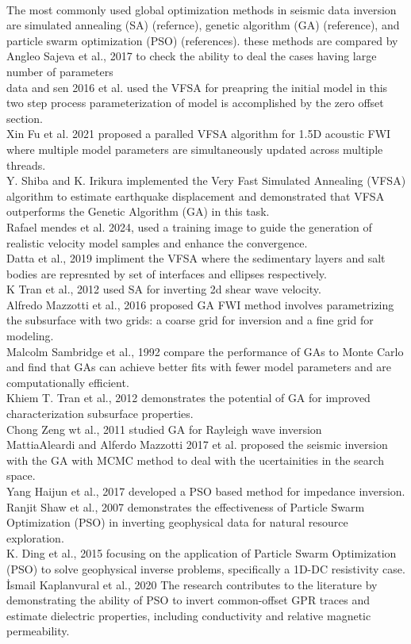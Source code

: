 \documentclass[paper,revised]{geophysics}
\begin{document}
\\
The most commonly used global optimization methods in seismic data inversion are simulated annealing (SA) (refernce), genetic algorithm (GA) (reference), and particle swarm optimization (PSO) (references). these methods are compared by Angleo Sajeva et al., 2017 to check the ability to deal the cases having large number of parameters
\\
data and sen 2016 et al. used the VFSA for preapring the initial model in this two step process parameterization of model is accomplished by the zero offset section.
\\
Xin Fu et al. 2021 proposed a paralled VFSA algorithm  for 1.5D acoustic FWI where multiple model parameters are simultaneously updated across multiple threads.
\\
Y. Shiba and K. Irikura implemented the Very Fast Simulated Annealing (VFSA) algorithm to estimate earthquake displacement and demonstrated that VFSA outperforms the Genetic Algorithm (GA) in this task.
\\
Rafael mendes et al. 2024, used a training image to guide the generation of realistic velocity model samples and enhance the convergence.
\\
Datta et al., 2019 impliment the VFSA where the sedimentary layers and salt bodies are represnted by set of interfaces and ellipses respectively.
\\
K Tran et al., 2012 used SA for inverting 2d shear wave velocity.
\\
Alfredo Mazzotti et al., 2016 proposed GA FWI method involves parametrizing the subsurface with two grids: a coarse grid for inversion and a fine grid for modeling.
\\
Malcolm Sambridge et al., 1992 compare the performance of GAs to Monte Carlo and  find that GAs can achieve better fits with fewer model parameters and are computationally efficient.
\\
Khiem T. Tran et al., 2012 demonstrates the potential of GA  for improved characterization subsurface properties.
\\
Chong Zeng wt al., 2011 studied GA for Rayleigh wave inversion
\\
MattiaAleardi and Alferdo Mazzotti 2017 et al. proposed the seismic inversion with the GA with MCMC method to deal with the ucertainities in the search space.
\\
Yang Haijun et al., 2017 developed a PSO based method for impedance inversion.
\\
Ranjit Shaw et al., 2007 demonstrates the effectiveness of Particle Swarm Optimization (PSO) in inverting geophysical data for natural resource exploration.
\\
K. Ding et al., 2015 focusing on the application of Particle Swarm Optimization (PSO) to solve geophysical inverse problems, specifically a 1D-DC resistivity case.
\\
İsmail Kaplanvural et al., 2020 The research contributes to the literature by demonstrating the ability of PSO to invert common-offset GPR traces and estimate dielectric properties, including conductivity and relative magnetic permeability. 
\\
\end{document}
